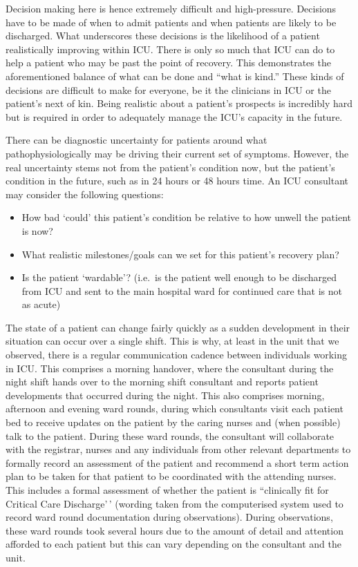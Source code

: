 \documentclass[a4paper, nobind]{templates/ociamthesis}
\providecommand{\tightlist}{%
  \setlength{\itemsep}{0pt}\setlength{\parskip}{0pt}}
\begin{document}
Decision making here is hence extremely difficult and high-pressure. Decisions have to be made of when to admit patients and when patients are likely to be discharged. What underscores these decisions is the likelihood of a patient realistically improving within ICU. There is only so much that ICU can do to help a patient who may be past the point of recovery. This demonstrates the aforementioned balance of what can be done and ``what is kind.'' These kinds of decisions are difficult to make for everyone, be it the clinicians in ICU or the patient's next of kin. Being realistic about a patient's prospects is incredibly hard but is required in order to adequately manage the ICU's capacity in the future.

There can be diagnostic uncertainty for patients around what pathophysiologically may be driving their current set of symptoms. However, the real uncertainty stems not from the patient's condition now, but the patient's condition in the future, such as in 24 hours or 48 hours time. An ICU consultant may consider the following questions:

\begin{itemize}
\tightlist
\item
  How bad `could' this patient's condition be relative to how unwell the patient is now?
\item
  What realistic milestones/goals can we set for this patient's recovery plan?
\item
  Is the patient `wardable'? (i.e.~is the patient well enough to be discharged from ICU and sent to the main hospital ward for continued care that is not as acute)
\end{itemize}

The state of a patient can change fairly quickly as a sudden development in their situation can occur over a single shift. This is why, at least in the unit that we observed, there is a regular communication cadence between individuals working in ICU. This comprises a morning handover, where the consultant during the night shift hands over to the morning shift consultant and reports patient developments that occurred during the night. This also comprises morning, afternoon and evening ward rounds, during which consultants visit each patient bed to receive updates on the patient by the caring nurses and (when possible) talk to the patient. During these ward rounds, the consultant will collaborate with the registrar, nurses and any individuals from other relevant departments to formally record an assessment of the patient and recommend a short term action plan to be taken for that patient to be coordinated with the attending nurses. This includes a formal assessment of whether the patient is ``clinically fit for Critical Care Discharge'\,' (wording taken from the computerised system used to record ward round documentation during observations). During observations, these ward rounds took several hours due to the amount of detail and attention afforded to each patient but this can vary depending on the consultant and the unit.
\end{document}

